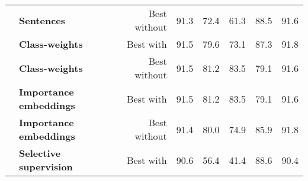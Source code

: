 \begin{table*}[]
\begin{tabular}{@{}rlrrrrrr@{}}
                                                      & \textbf{Sentences}               & Best without                                       & 91.3                                                   & 72.4                            & 61.3                                   & 88.5                                & 91.6                                                                                                      \\ \cmidrule(l){2-8} 
                                                      & \textbf{Class-weights}           & Best with                                          & 91.5                                                   & 79.6                            & 73.1                                   & 87.3                                & 91.8                                                                                                      \\
                                                      & \textbf{Class-weights}           & Best without                                       & 91.5                                                   & 81.2                            & 83.5                                   & 79.1                                & 91.6                                                                                                      \\ \cmidrule(l){2-8} 
                                                      & \textbf{Importance embeddings}   & Best with                                          & 91.5                                                   & 81.2                            & 83.5                                   & 79.1                                & 91.6                                                                                                      \\
                                                      & \textbf{Importance embeddings}   & Best without                                       & 91.4                                                   & 80.0                            & 74.9                                   & 85.9                                & 91.8                                                                                                      \\ \cmidrule(l){2-8} 
                                                      & \textbf{Selective supervision}   & Best with                                          & 90.6                                                   & 56.4                            & 41.4                                   & 88.6                                & 90.4                                                                                                      \\

\end{tabular}
\end{table*}
